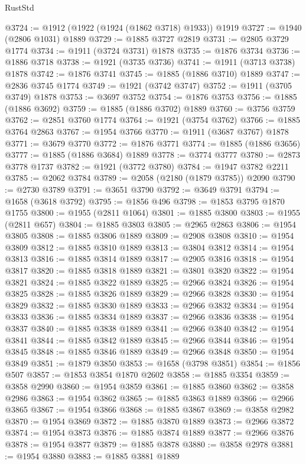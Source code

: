 \begin{lexlean}{RustStd}
\begin{coremodule}
@3724 := @1912 (@1922 (@1924 (@1862 @3718) @1933)) @1919
@3727 := @1940 (@2806 @1031) @1889
@3729 := @1885 @3727 @2819
@3731 := @2805 @3729 @1774
@3734 := @1911 (@3724 @3731) @1878
@3735 := @1876 @3734
@3736 := @1886 @3718
@3738 := @1921 (@3735 @3736)
@3741 := @1911 (@3713 @3738) @1878
@3742 := @1876 @3741
@3745 := @1885 (@1886 @3710) @1889
@3747 := @2836 @3745 @1774
@3749 := @1921 (@3742 @3747)
@3752 := @1911 (@3705 @3749) @1878
@3753 := @3697 @3752
@3754 := @1876 @3753
@3756 := @1885 (@1886 @3692)
@3759 := @1885 (@1886 @3702) @1889
@3760 := @3756 @3759
@3762 := @2851 @3760 @1774
@3764 := @1921 (@3754 @3762)
@3766 := @1885 @3764 @2863
@3767 := @1954 @3766
@3770 := @1911 (@3687 @3767) @1878
@3771 := @3679 @3770
@3772 := @1876 @3771
@3774 := @1885 (@1886 @3656)
@3777 := @1885 (@1886 @3684) @1889
@3778 := @3774 @3777
@3780 := @2873 @3778 @1737
@3782 := @1921 (@3772 @3780)
@3784 := @1947 @3782 @2211
@3785 := @2062 @3784
@3789 := @2058 (@2180 (@1879 @3785)) @2090
@3790 := @2730 @3789
@3791 := @3651 @3790
@3792 := @3649 @3791
@3794 := @1658 (@3618 @3792)
@3795 := @1856 @496
@3798 := @1853 @3795 @1870 @1755
@3800 := @1955 (@2811 @1064)
@3801 := @1885 @3800
@3803 := @1955 (@2811 @657)
@3804 := @1885 @3803
@3805 := @2965 @2863
@3806 := @1954 @3805
@3808 := @1885 @3806 @1889
@3809 := @2908 @3808
@3810 := @1954 @3809
@3812 := @1885 @3810 @1889
@3813 := @3804 @3812
@3814 := @1954 @3813
@3816 := @1885 @3814 @1889
@3817 := @2905 @3816
@3818 := @1954 @3817
@3820 := @1885 @3818 @1889
@3821 := @3801 @3820
@3822 := @1954 @3821
@3824 := @1885 @3822 @1889
@3825 := @2966 @3824
@3826 := @1954 @3825
@3828 := @1885 @3826 @1889
@3829 := @2966 @3828
@3830 := @1954 @3829
@3832 := @1885 @3830 @1889
@3833 := @2966 @3832
@3834 := @1954 @3833
@3836 := @1885 @3834 @1889
@3837 := @2966 @3836
@3838 := @1954 @3837
@3840 := @1885 @3838 @1889
@3841 := @2966 @3840
@3842 := @1954 @3841
@3844 := @1885 @3842 @1889
@3845 := @2966 @3844
@3846 := @1954 @3845
@3848 := @1885 @3846 @1889
@3849 := @2966 @3848
@3850 := @1954 @3849
@3851 := @1879 @3850
@3853 := @1658 (@3798 @3851)
@3854 := @1856 @507
@3857 := @1853 @3854 @1870 @2602
@3858 := @1885 @3354
@3859 := @3858 @2990
@3860 := @1954 @3859
@3861 := @1885 @3860
@3862 := @3858 @2986
@3863 := @1954 @3862
@3865 := @1885 @3863 @1889
@3866 := @2966 @3865
@3867 := @1954 @3866
@3868 := @1885 @3867
@3869 := @3858 @2982
@3870 := @1954 @3869
@3872 := @1885 @3870 @1889
@3873 := @2966 @3872
@3874 := @1954 @3873
@3876 := @1885 @3874 @1889
@3877 := @2966 @3876
@3878 := @1954 @3877
@3879 := @1885 @3878
@3880 := @3858 @2978
@3881 := @1954 @3880
@3883 := @1885 @3881 @1889

\end{coremodule}
\end{lexlean}
